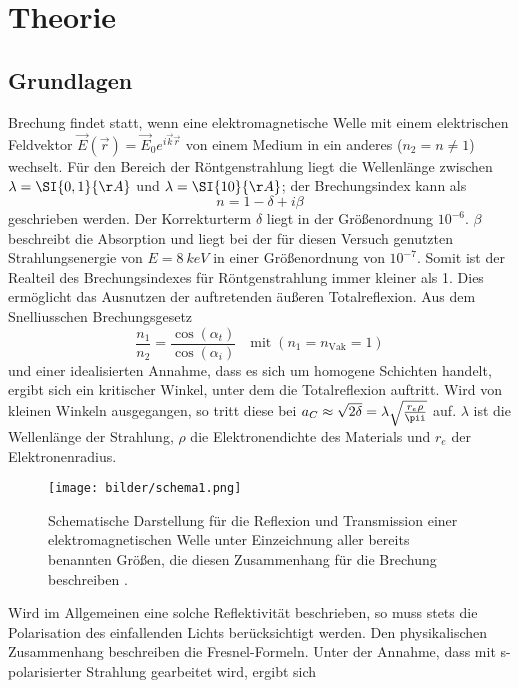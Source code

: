 \section{Theorie}
\subsection{Grundlagen}
Brechung findet statt, wenn eine elektromagnetische Welle mit einem elektrischen Feldvektor $\vec{E}(\vec{r})=\vec{E}_0e^{i\vec{k}\vec{r}}$ von einem Medium in ein anderes ($n_2=n\neq1$) wechselt. Für den Bereich der Röntgenstrahlung liegt die Wellenlänge zwischen $\lambda=\SI{0,1}{\AA}$ und $\lambda=\SI{10}{\AA}$; der Brechungsindex kann als
\begin{equation*}
  n=1-\delta+i\beta
  \label{eq:brechungsindex}
\end{equation*}
geschrieben werden. Der Korrekturterm $\delta$ liegt in der Größenordnung $10^{-6}$. $\beta$ beschreibt die Absorption und liegt bei der für diesen Versuch genutzten Strahlungsenergie von $E=\SI{8}{keV}$ in einer Größenordnung von $10^{-7}$. Somit ist der Realteil des Brechungsindexes für Röntgenstrahlung immer kleiner als 1. Dies ermöglicht das Ausnutzen der auftretenden äußeren Totalreflexion. Aus dem Snelliusschen Brechungsgesetz
\begin{equation*}
\frac{n_1}{n_2}=\frac{\cos(\alpha_t)}{\cos(\alpha_i)}\quad\text{mit}\; (n_1=n_\text{Vak}=1)
\label{eq:snellius}
\end{equation*}
 und einer idealisierten Annahme, dass es sich um homogene Schichten handelt, ergibt sich ein kritischer Winkel, unter dem die Totalreflexion auftritt. Wird von kleinen Winkeln ausgegangen, so tritt diese bei $a_C\approx\sqrt{2\delta}=\lambda\sqrt{\frac{r_e\rho}{\pii}}$
 auf. $\lambda$ ist die Wellenlänge der Strahlung, $\rho$ die Elektronendichte des Materials und $r_e$ der Elektronenradius.
 \begin{figure}[H]
   \centering
   \texttt{[image: bilder/schema1.png]}
   \caption{Schematische Darstellung für die Reflexion und Transmission einer elektromagnetischen Welle unter Einzeichnung aller bereits benannten Größen, die diesen Zusammenhang für die Brechung beschreiben \cite{anleitung}.}
   \label{schema1}
 \end{figure}
Wird im Allgemeinen eine solche Reflektivität beschrieben, so muss stets die Polarisation des einfallenden Lichts berücksichtigt werden. Den physikalischen Zusammenhang beschreiben die Fresnel-Formeln. Unter der Annahme, dass mit s-polarisierter Strahlung gearbeitet wird, ergibt sich
